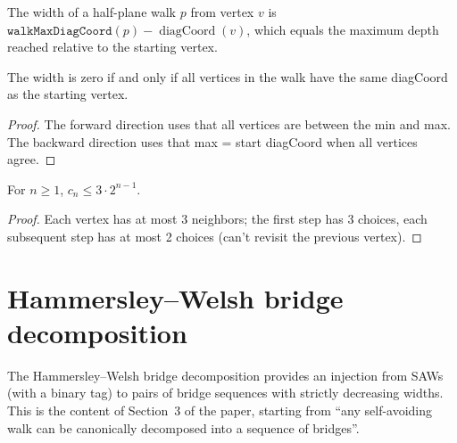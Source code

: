\begin{lemma}
\begin{definition}\label{def:halfPlaneWidth}
\leanok
{}
  The width of a half-plane walk $p$ from vertex $v$ is
  $\texttt{walkMaxDiagCoord}(p) - \operatorname{diagCoord}(v)$,
  which equals the maximum depth reached relative to the starting vertex.
\end{definition}

\begin{lemma}\label{lem:halfPlaneWidth_zero}
\leanok
{}
  The width is zero if and only if all vertices in the walk have the same
  diagCoord as the starting vertex.
\end{lemma}
\begin{proof}\leanok
  The forward direction uses that all vertices are between the min and max.
  The backward direction uses that max = start diagCoord when all vertices
  agree.
\end{proof}

\begin{lemma}\label{lem:saw_count_upper}
\leanok
  For $n \geq 1$, $c_n \leq 3 \cdot 2^{n-1}$.
\end{lemma}
\begin{proof}\leanok
  Each vertex has at most 3 neighbors; the first step has 3 choices,
  each subsequent step has at most 2 choices (can't revisit the
  previous vertex).
\end{proof}

\section{Hammersley--Welsh bridge decomposition}\label{sec:hw_decomp}

The Hammersley--Welsh bridge decomposition provides an injection from
SAWs (with a binary tag) to pairs of bridge sequences with strictly
decreasing widths. This is the content of Section~3 of the paper,
starting from ``any self-avoiding walk can be canonically decomposed
into a sequence of bridges''.


\end{lemma}
